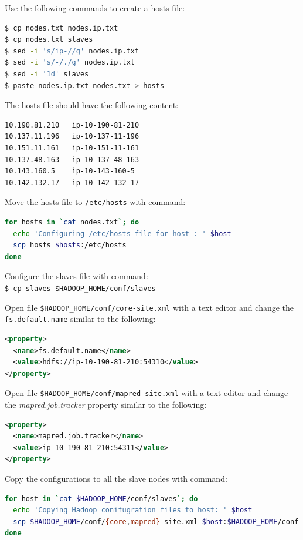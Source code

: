 Use the following commands to create a hosts file:
\lstset{style=bashstyle}
\begin{lstlisting}[language=bash]
$ cp nodes.txt nodes.ip.txt
$ cp nodes.txt slaves
$ sed -i 's/ip-//g' nodes.ip.txt
$ sed -i 's/-/./g' nodes.ip.txt
$ sed -i '1d' slaves
$ paste nodes.ip.txt nodes.txt > hosts
\end{lstlisting}

The hosts file should have the following content:
\lstset{style=bashstyle}
\begin{lstlisting}
10.190.81.210   ip-10-190-81-210
10.137.11.196   ip-10-137-11-196
10.151.11.161   ip-10-151-11-161
10.137.48.163   ip-10-137-48-163
10.143.160.5    ip-10-143-160-5
10.142.132.17   ip-10-142-132-17
\end{lstlisting}

Move the hosts file to \verb|/etc/hosts| with command:
\lstset{style=bashstyle}
\begin{lstlisting}[language=bash]
for hosts in `cat nodes.txt`; do
  echo 'Configuring /etc/hosts file for host : ' $host
  scp hosts $hosts:/etc/hosts
done
\end{lstlisting}

Configure the slaves file with command: \\
\verb|$ cp slaves $HADOOP_HOME/conf/slaves|

Open file \verb|$HADOOP_HOME/conf/core-site.xml| with a text editor and change the \verb|fs.default.name| similar to the following:
\lstset{style=bashstyle}
\begin{lstlisting}[language=XML]
<property>
  <name>fs.default.name</name>
  <value>hdfs://ip-10-190-81-210:54310</value>
</property>
\end{lstlisting}

Open file \verb|$HADOOP_HOME/conf/mapred-site.xml| with a text editor and change the \emph{mapred.job.tracker} property similar to the following:
\lstset{style=bashstyle}
\begin{lstlisting}[language=XML]
<property>
  <name>mapred.job.tracker</name>
  <value>ip-10-190-81-210:54311</value>
</property>
\end{lstlisting}

Copy the configurations to all the slave nodes with command: 
\lstset{style=bashstyle}
\begin{lstlisting}[language=bash]
for host in `cat $HADOOP_HOME/conf/slaves`; do
  echo 'Copying Hadoop conifugration files to host: ' $host
  scp $HADOOP_HOME/conf/{core,mapred}-site.xml $host:$HADOOP_HOME/conf
done
\end{lstlisting}

